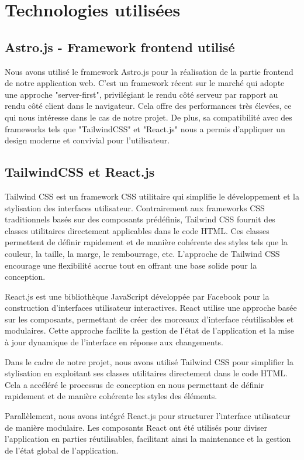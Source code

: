\documentclass[12pt, a4paper, oneside]{Thesis}
\begin{document}
\section{Technologies utilisées}
\subsection{Astro.js - Framework frontend utilisé}
Nous avons utilisé le framework Astro.js pour la réalisation de la partie frontend de notre application web. C'est un framework récent sur le marché qui adopte une approche "server-first", privilégiant le rendu côté serveur par rapport au rendu côté client dans le navigateur. Cela offre des performances très élevées, ce qui nous intéresse dans le cas de notre projet. De plus, sa compatibilité avec des frameworks tels que "TailwindCSS" et "React.js" nous a permis d'appliquer un design moderne et convivial pour l'utilisateur.

\subsection{TailwindCSS et React.js}
Tailwind CSS est un framework CSS utilitaire qui simplifie le développement et la stylisation des interfaces utilisateur. Contrairement aux frameworks CSS traditionnels basés sur des composants prédéfinis, Tailwind CSS fournit des classes utilitaires directement applicables dans le code HTML. Ces classes permettent de définir rapidement et de manière cohérente des styles tels que la couleur, la taille, la marge, le rembourrage, etc. L'approche de Tailwind CSS encourage une flexibilité accrue tout en offrant une base solide pour la conception.

React.js est une bibliothèque JavaScript développée par Facebook pour la construction d'interfaces utilisateur interactives. React utilise une approche basée sur les composants, permettant de créer des morceaux d'interface réutilisables et modulaires. Cette approche facilite la gestion de l'état de l'application et la mise à jour dynamique de l'interface en réponse aux changements.

Dans le cadre de notre projet, nous avons utilisé Tailwind CSS pour simplifier la stylisation en exploitant ses classes utilitaires directement dans le code HTML. Cela a accéléré le processus de conception en nous permettant de définir rapidement et de manière cohérente les styles des éléments.

Parallèlement, nous avons intégré React.js pour structurer l'interface utilisateur de manière modulaire. Les composants React ont été utilisés pour diviser l'application en parties réutilisables, facilitant ainsi la maintenance et la gestion de l'état global de l'application.
\end{document}
